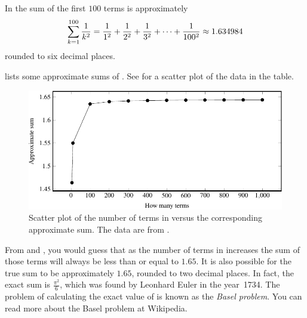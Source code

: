 \documentclass[a4paper,oneside,12pt]{article}
\begin{document}
\begin{problem}
{\begin{solution}
In  the sum of the first $100$ terms is
approximately
\[
\sum_{k=1}^{100} \frac{1}{k^2}
=
{
  \frac{1}{1^2}
  +
  \frac{1}{2^2}
} + {
  \frac{1}{3^2}
} + \cdots + {
  \frac{1}{100^2}
}
\approx
1.634984
\]
rounded to six decimal places.

 lists some approximate sums
of .  See
 for a scatter plot of the
data in the table.

\begin{table}[!htbp]
\centering

\caption{%
  Approximate sums of .
}
\label{tab:Basel_problem_approximate_sums}
\end{table}

\begin{figure}[!htbp]
\centering
\includegraphics[scale=1]{image/07/basel-problem-scatterplot.pdf}
\caption{%
  Scatter plot of the number of terms in
   versus the corresponding approximate
  sum.  The data are from .
}
\label{fig:Basel_problem_approximate_sums}
\end{figure}

From  and
, you would guess that as
the number of terms in  increases the
sum of those terms will always be less than or equal to $1.65$.  It is
also possible for the true sum to be approximately $1.65$, rounded to
two decimal places.  In fact, the exact sum is $\frac{\pi^2}{6}$,
which was found by Leonhard Euler in the year~1734.  The problem of
calculating the exact value of  is known
as the \emph{Basel problem}.  You can read more about the Basel
problem at Wikipedia.
\end{solution}
}{}


\end{problem}
\end{document}
